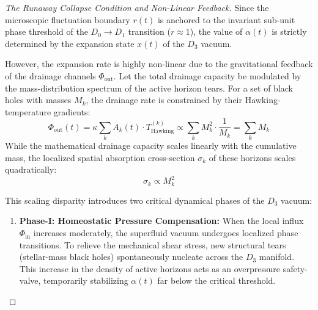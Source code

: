 \documentclass[11pt,a4paper]{article}
\theoremstyle{plain}
\theoremstyle{definition}
\theoremstyle{remark}
\begin{document}
\begin{proof}[The Runaway Collapse Condition and Non-Linear Feedback]
Since the microscopic fluctuation boundary $r(t)$ is anchored to the invariant sub-unit phase threshold of the $D_0 \to D_1$ transition ($r \approx 1$), the value of $\alpha(t)$ is strictly determined by the expansion state $x(t)$ of the $D_3$ vacuum. 

However, the expansion rate is highly non-linear due to the gravitational feedback of the drainage channels $\Phi_{\text{out}}$. Let the total drainage capacity be modulated by the mass-distribution spectrum of the active horizon tears. For a set of black holes with masses $M_k$, the drainage rate is constrained by their Hawking-temperature gradients:
\begin{equation}
\Phi_{\text{out}}(t) = \kappa \sum_{k} A_k(t) \cdot T_{\text{Hawking}}^{(k)} \propto \sum_{k} M_k^2 \cdot \frac{1}{M_k} = \sum_{k} M_k
\end{equation}
While the mathematical drainage capacity scales linearly with the cumulative mass, the localized spatial absorption cross-section $\sigma_k$ of these horizons scales quadratically:
\begin{equation}
\sigma_k \propto M_k^2
\end{equation}

This scaling disparity introduces two critical dynamical phases of the $D_3$ vacuum:
\begin{enumerate}
    \item \textbf{Phase-I: Homeostatic Pressure Compensation:}
    When the local influx $\Phi_{\text{in}}$ increases moderately, the superfluid vacuum undergoes localized phase transitions. To relieve the mechanical shear stress, new structural tears (stellar-mass black holes) spontaneously nucleate across the $D_3$ manifold. This increase in the density of active horizons acts as an overpressure safety-valve, temporarily stabilizing $\alpha(t)$ far below the critical threshold.
    

\end{enumerate}
\end{proof}
\end{document}
